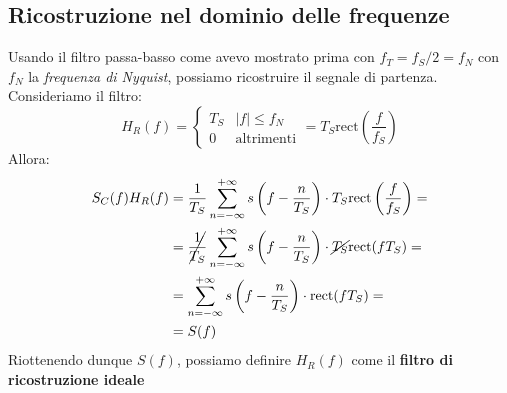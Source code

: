 \subsection{Ricostruzione nel dominio delle frequenze}
Usando il filtro passa-basso come avevo mostrato prima con $f_T = f_S/2 = f_N$ con $f_N$ la \textit{frequenza di Nyquist},
possiamo ricostruire il segnale di partenza. Consideriamo il filtro:
\begin{equation}
    H_R(f) = \begin{cases}
        T_S & |f| \leq f_N\\
        0   & \text{altrimenti}
    \end{cases}= T_S\text{rect}\left(\frac{f}{f_S}\right)
\end{equation}
Allora:
\begin{align*}
    S_C(f)H_R(f) &= \frac{1}{T_S} \sum_{n = -\infty}^{+\infty} s\left(f - \frac{n}{T_S}\right) \cdot T_S \text{rect}\left(\frac{f}{f_S}\right) =\\
                 &= \cancel{\frac{1}{T_S}} \sum_{n = -\infty}^{+\infty} s\left(f - \frac{n}{T_S}\right) \cdot \cancel{T_S} \text{rect}(fT_S) =\\
                 &= \sum_{n = -\infty}^{+\infty} s\left(f - \frac{n}{T_S}\right) \cdot \text{rect}(fT_S) =\\
                 &= S(f)
\end{align*}
Riottenendo dunque $S(f)$, possiamo definire $H_R(f)$ come il \textbf{filtro di ricostruzione ideale}


